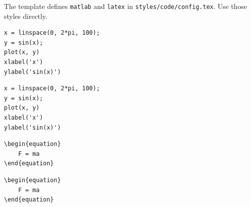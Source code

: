 \begin{referencecode}
\usepackage{uc3m-report}
\end{referencecode}
The template defines \texttt{matlab} and \texttt{latex} in
\texttt{styles/code/config.tex}. Use those styles directly.
\begin{referencecode}
\begin{lstlisting}[style=matlab]
x = linspace(0, 2*pi, 100);
y = sin(x);
plot(x, y)
xlabel('x')
ylabel('sin(x)')
\end{lstlisting}
\end{referencecode}

\begin{lstlisting}[style=matlab]
x = linspace(0, 2*pi, 100);
y = sin(x);
plot(x, y)
xlabel('x')
ylabel('sin(x)')
\end{lstlisting}

\begin{referencecode}
\begin{lstlisting}[style=latex]
\begin{equation}
    F = ma
\end{equation}
\end{lstlisting}
\end{referencecode}

\begin{lstlisting}[style=latex]
\begin{equation}
    F = ma
\end{equation}
\end{lstlisting}

